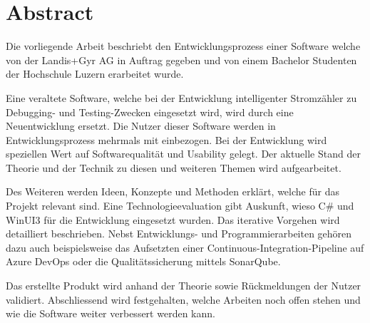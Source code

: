 \begingroup
\let\clearpage\relax
\let\cleardoublepage\relax
\let\cleardoublepage\relax

\cleardoublepage


\chapter*{Abstract}
Die vorliegende Arbeit beschriebt den Entwicklungsprozess einer Software welche von der Landis+Gyr AG in Auftrag gegeben und von einem Bachelor Studenten der Hochschule Luzern erarbeitet wurde.

Eine veraltete Software, welche bei der Entwicklung intelligenter Stromzähler zu Debugging- und Testing-Zwecken eingesetzt wird, wird durch eine Neuentwicklung ersetzt.
Die Nutzer dieser Software werden in Entwicklungsprozess mehrmals mit einbezogen.
Bei der Entwicklung wird speziellen Wert auf Softwarequalität und Usability gelegt.
Der aktuelle Stand der Theorie und der Technik zu diesen und weiteren Themen wird aufgearbeitet.

Des Weiteren werden Ideen, Konzepte und Methoden erklärt, welche für das Projekt relevant sind.
Eine Technologieevaluation gibt Auskunft, wieso C\# und WinUI3 für die Entwicklung eingesetzt wurden.
Das iterative Vorgehen wird detailliert beschrieben.
Nebst Entwicklungs- und Programmierarbeiten gehören dazu auch beispielsweise das Aufsetzten einer Continuous-Integration-Pipeline auf Azure DevOps oder die Qualitätssicherung mittels SonarQube.

Das erstellte Produkt wird anhand der Theorie sowie Rückmeldungen der Nutzer validiert.
Abschliessend wird festgehalten, welche Arbeiten noch offen stehen und wie die Software weiter verbessert werden kann.
\endgroup

\vfill
